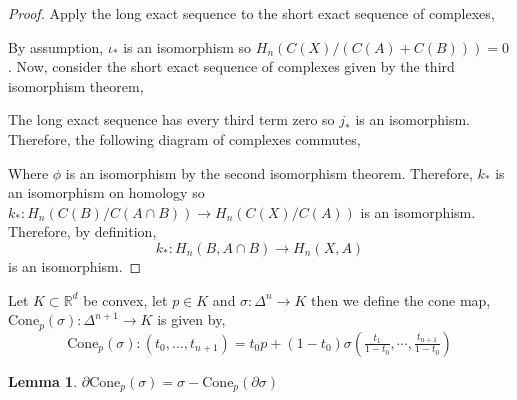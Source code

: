 \documentclass[12pt]{extarticle}
\newcommand{\R}{\mathbb{R}}
\theoremstyle{definition}
\newtheorem{lemma}[theorem]{Lemma}
\newenvironment{definition}[1][Definition:]{\begin{trivlist}
\item[\hskip \labelsep {\bfseries #1}]}{\end{trivlist}}
\begin{document}
\begin{proof}
Apply the long exact sequence to the short exact sequence of complexes,

\begin{center}
\end{center}

By assumption, $\iota_{*}$ is an isomorphism so $H_n(C(X)/(C(A) + C(B))) = 0$. Now, consider the short exact sequence of complexes given by the third isomorphism theorem,

\begin{center}
\end{center}
The long exact sequence has every third term zero so $j_*$ is an isomorphism. Therefore, the following diagram of complexes commutes,

\begin{center}
\end{center}
Where $\phi$ is an isomorphism by the second isomorphism theorem. Therefore, $k_{*}$ is an isomorphism on homology so $k_{*} : H_n(C(B)/C(A \cap B)) \to H_n(C(X)/C(A))$ is an isomorphism. Therefore, by definition,
\[ k_* : H_n(B, A \cap B) \to H_n(X, A)\]
is an isomorphism.
\end{proof}

\newcommand{\cone}{\mathrm{Cone}}

\begin{definition}
Let $K \subset \R^d$ be convex, let $p \in K$ and $\sigma : \Delta^n \to K$ then we define the cone map, $\cone_p(\sigma) : \Delta^{n+1} \to K$ is given by, 
\[\cone_p(\sigma) : (t_0, \dots, t_{n+1}) = t_0 p + (1 - t_0) \sigma\left(\tfrac{t_1}{1-t_0}, \cdots, \tfrac{t_{n+1}}{1-t_0} \right)\]
\end{definition}

\begin{lemma}
$\partial \cone_p(\sigma) = \sigma - \cone_p(\partial \sigma)$
\end{lemma}
\end{document}
